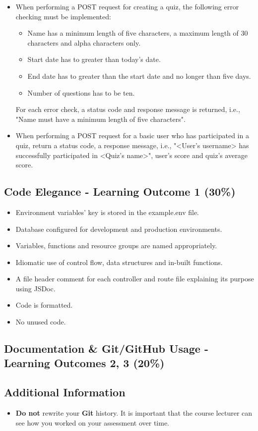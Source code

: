 \documentclass{article}
\begin{document}
\begin{itemize}
\begin{itemize}
		\item When performing a POST request for creating a quiz, the following error checking must be implemented:
		\begin{itemize}
			\item Name has a minimum length of five characters, a maximum length of 30 characters and alpha characters only.
			\item Start date has to greater than today's date.
			\item End date has to greater than the start date and no longer than five days. 
			\item Number of questions has to be ten.
		\end{itemize}
		For each error check, a status code and response message is returned, i.e., "Name must have a minimum length of five characters".
		\item When performing a POST request for a basic user who has participated in a quiz, return a status code, a response message, i.e., "<User's username> has successfully participated in <Quiz's name>", user's score and quiz's average score.
	\end{itemize}
\end{itemize}

\subsection*{Code Elegance - Learning Outcome 1 (30\%)}
\begin{itemize}
	\item Environment variables' key is stored in the example.env file. 
	\item Database configured for development and production environments.
	\item Variables, functions and resource groups are named appropriately.
	\item Idiomatic use of control flow, data structures and in-built functions.
	\item A file header comment for each controller and route file explaining its purpose using JSDoc.
	\item Code is formatted.
	\item No unused code.
\end{itemize}

\subsection*{Documentation \& Git/GitHub Usage - Learning Outcomes 2, 3 (20\%)}
	

\subsection*{Additional Information}
\begin{itemize}
	\item \textbf{Do not} rewrite your \textbf{Git} history. It is important that the course lecturer can see how you worked on your assessment over time.
\end{itemize}
\end{document}
